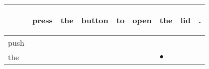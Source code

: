 \documentclass[landscape]{article}
\newcommand{\ssp}{\hspace{2pt}}
\newcommand{\mex}{\cellcolor{g}$\bullet$}
\begin{document}
\newpage

\noindent\begin{tabular}{|l|p{10pt}|p{10pt}|p{10pt}|p{10pt}|p{10pt}|p{10pt}|p{10pt}|p{10pt}|}
\hline
&\begin{sideways}\cellcolor{ref0}press\hspace{12pt}\end{sideways}&\begin{sideways}\cellcolor{ref1}the\hspace{12pt}\end{sideways}&\begin{sideways}\cellcolor{ref2}button\hspace{12pt}\end{sideways}&\begin{sideways}\cellcolor{ref3}to\hspace{12pt}\end{sideways}&\begin{sideways}\cellcolor{ref4}open\hspace{12pt}\end{sideways}&\begin{sideways}\cellcolor{ref5}the\hspace{12pt}\end{sideways}&\begin{sideways}\cellcolor{ref6}lid\hspace{12pt}\end{sideways}&\begin{sideways}\cellcolor{ref7}.\hspace{12pt}\end{sideways}\\
\hline
\ssp push \ssp&\hspace{2pt}&\hspace{2pt}&\hspace{2pt}&\hspace{2pt}&\hspace{2pt}&\hspace{2pt}&\hspace{2pt}&\hspace{2pt}\\
\hline
\ssp \cellcolor{ref5}the \ssp&\hspace{2pt}&\hspace{2pt}&\hspace{2pt}&\hspace{2pt}&\hspace{2pt}&\hspace{2pt}\mex&\hspace{2pt}&\hspace{2pt}\\

\end{tabular}
\end{document}
